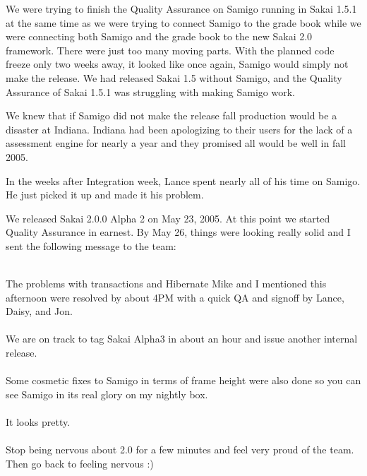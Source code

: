 \documentclass[12pt]{book}
\begin{document}
We were trying to finish the Quality Assurance on Samigo
running in Sakai 1.5.1 at the same time as we were trying
to connect Samigo to the grade book while we were
connecting both Samigo and the grade book to the new Sakai
2.0 framework. There were just too many moving parts.
With the planned code freeze only two weeks away,
it looked like once
again, Samigo would simply not make the release.   We had
released Sakai 1.5 without Samigo, and the Quality Assurance
of Sakai 1.5.1 was struggling with making Samigo work.

We knew that if Samigo did not make the release
fall production would be a disaster at Indiana.
Indiana had been apologizing to their users for the lack
of a assessment engine for nearly a year and
they promised all would be well in fall 2005.

In the weeks after Integration week, Lance spent nearly
all of his time on Samigo.  He just picked it up and made
it his problem.

We released Sakai 2.0.0 Alpha 2 on May 23, 2005.  At
this point we started Quality Assurance in earnest.
By May 26, things were looking really solid and I sent
the following message to the team:\\
\\
\begin{sf}
The problems with transactions and Hibernate Mike and I
mentioned this afternoon were resolved by about 4PM with
a quick QA and signoff by Lance, Daisy, and Jon.\\
\\
We are on track to tag Sakai Alpha3 in about an hour and
issue another internal release.\\
\\
Some cosmetic fixes to Samigo in terms of frame height
were also done so you can see Samigo in its real glory on
my nightly box.\\
\\
It looks pretty.\\
\\
Stop being nervous about 2.0 for a few minutes and feel
very proud of the team.  Then go back to feeling nervous :)\\
\end{sf}
\end{document}
